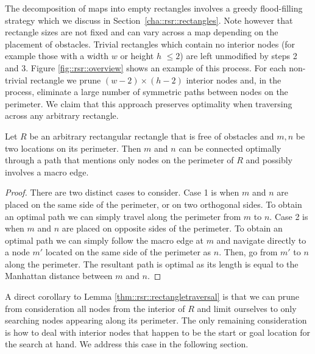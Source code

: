 The decomposition of maps into empty rectangles involves a greedy flood-filling
strategy which we discuss in Section~\ref{cha::rsr::rectangles}. Note however
that rectangle sizes are not fixed and can vary across a map depending on the
placement of obstacles.  Trivial rectangles which contain no interior nodes (for
example those with a width $w$ or height $h$ $\leq 2$) are left unmodified by
steps 2 and 3.  Figure \ref{fig::rsr::overview} shows an example of this process.  For
each non-trivial rectangle we prune $(w-2)\times(h-2)$ interior nodes and, in
the process, eliminate a large number of symmetric paths between nodes on the
perimeter.  We claim that this approach preserves optimality when traversing
across any arbitrary rectangle.

\begin{lemma}
\label{thm::rsr::rectangletraversal}
Let $R$ be an arbitrary rectangular rectangle that is free of obstacles
and $m, n$ be two locations on its perimeter.
Then $m$ and $n$ can be connected optimally through a path that
mentions only nodes on the perimeter of $R$ and possibly involves
a macro edge.
\end{lemma}
\begin{proof}
\par
There are two distinct cases to consider.
Case 1 is when $m$ and $n$ are placed on the same side of the perimeter, or
on two orthogonal sides. 
To obtain an optimal path we can simply travel along the perimeter from $m$ to $n$.
Case 2 is when $m$ and $n$ are placed on opposite sides of the perimeter.
To obtain an optimal path we can simply follow the macro edge at $m$ 
and navigate directly to a node $m'$ located on
the same side of the perimeter as $n$. Then, go from $m'$ to $n$ along the perimeter.
The resultant path is optimal as its length is equal to the Manhattan distance between $m$ and $n$.
\end{proof}

A direct corollary to Lemma \ref{thm::rsr::rectangletraversal} is that we can prune from consideration
all nodes from the interior of $R$ and limit ourselves to only searching nodes appearing along its perimeter. 
The only remaining consideration is how to deal with interior nodes that happen
to be the start or goal location for the search at hand.
We address this case in the following section.

